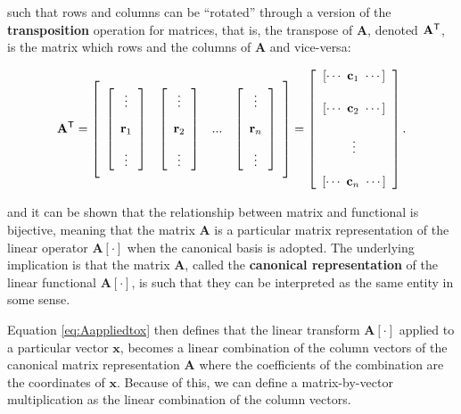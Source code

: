 	\noindent such that rows and columns can be ``rotated'' through a version of the \textbf{transposition} operation for matrices, that is, the transpose of $\mathbf{A}$, denoted $\mathbf{A}^{\mathsf{T}}$, is the matrix which rows and the columns of $\mathbf{A}$ and vice-versa:

\begin{equation} \mathbf{A}^\transpose = \left[\raisebox{15mm}{} \begin{array}{cccc} \left[\begin{array}{c} \vdots \\[3mm] \mathbf{r}_1 \\[3mm] \vdots \end{array}\right] & \left[\begin{array}{c} \vdots \\[3mm] \mathbf{r}_2 \\[3mm] \vdots \end{array}\right] & ... & \left[\begin{array}{c} \vdots \\[3mm] \mathbf{r}_n \\[3mm] \vdots \end{array}\right]\end{array}\right] = \left[\begin{array}{c} \left[\cdots\ \mathbf{c}_1\ \cdots \right] \\[5mm] \left[\cdots\ \mathbf{c}_2\  \cdots \right] \\[5mm]  \vdots  \\[5mm] \left[\cdots\ \mathbf{c}_n\ \cdots \right] \end{array}\right] .\end{equation}

	\noindent and it can be shown that the relationship between matrix and functional is bijective, meaning that the matrix $\mathbf{A}$ is a particular matrix representation of the linear operator $\mathbf{A}\left[\cdot\right]$ when the canonical basis is adopted. The underlying implication is that the matrix $\mathbf{A}$, called the \textbf{canonical representation} of the linear functional $\mathbf{A}\left[\cdot\right]$, is such that they can be interpreted as the same entity in some sense.

	Equation \eqref{eq:Aappliedtox} then defines that the linear transform $\mathbf{A}\left[\cdot\right]$ applied to a particular vector $\mathbf{x}$, becomes a linear combination of the column vectors of the canonical matrix representation $\mathbf{A}$ where the coefficients of the combination are the coordinates of $\mathbf{x}$. Because of this, we can define a matrix-by-vector multiplication as the linear combination of the column vectors.

